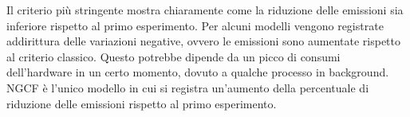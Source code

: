 \begin{table}[H]
    \centering
    \caption{Confronto delle emissioni}
\end{table}


\noindent Il criterio più stringente mostra chiaramente come la riduzione delle emissioni sia inferiore rispetto al primo esperimento.
Per alcuni modelli vengono registrate addirittura delle variazioni negative, ovvero le emissioni sono aumentate rispetto al criterio classico. Questo potrebbe dipende da un picco di consumi dell'hardware in un certo momento, dovuto a qualche processo in background.
NGCF è l'unico modello in cui si registra un'aumento della percentuale di riduzione delle emissioni rispetto al primo esperimento.


